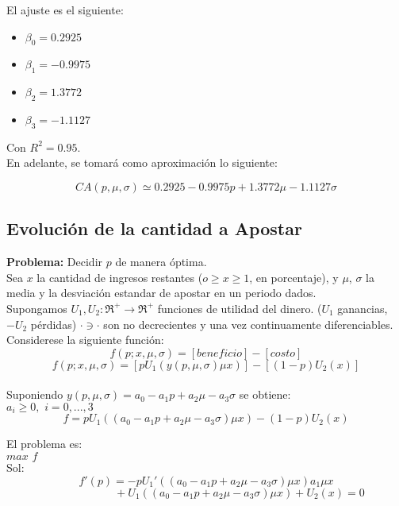 El ajuste es el siguiente:

\begin{itemize}
 \item $\beta_0=0.2925$
  \item $\beta_1=-0.9975$
 \item $\beta_2=1.3772$
 \item $\beta_3=-1.1127$
\end{itemize}

Con $R^2=0.95$.\\

En adelante, se tomará como aproximación lo siguiente:

\[CA(p,\mu,\sigma)\simeq0.2925-0.9975p+1.3772\mu-1.1127\sigma\]

\subsection{Evolución de la cantidad a Apostar}

{\bf Problema:} Decidir $p$ de manera óptima.\\

Sea $x$ la cantidad de ingresos restantes ($o\ge x\ge1$, en porcentaje), y $\mu$, $\sigma$ la media y la desviación estandar de apostar en un periodo dados.\\

Supongamos $U_1,U_2: \Re^+\rightarrow \Re^+$ funciones de utilidad del dinero. ($U_1$ ganancias, $-U_2$ pérdidas) $\cdot\ni\cdot$ son no decrecientes y una vez continuamente diferenciables. Considerese la siguiente función:\\

\[f(p;x,\mu,\sigma)=[beneficio]-[costo]\]
\[f(p;x,\mu,\sigma)=[pU_1(y(p,\mu,\sigma)\mu x)]-[(1-p)U_2(x)]\]\\

Suponiendo $y(p,\mu,\sigma)=a_0-a_1p+a_2\mu-a_3\sigma$ se obtiene:\\

$a_i\ge 0,\,\,i=0,...,3$
\[f=pU_1((a_0-a_1p+a_2\mu-a_3\sigma)\mu x)-(1-p)U_2(x)\]

El problema es:\\

$max\,\,f$\\

Sol:\\

\[f'(p)=-pU_1'((a_0-a_1p+a_2\mu-a_3\sigma)\mu x)a_1\mu x\]
\[\qquad\qquad\qquad+U_1((a_0-a_1p+a_2\mu-a_3\sigma)\mu x)+U_2(x)=0\]

